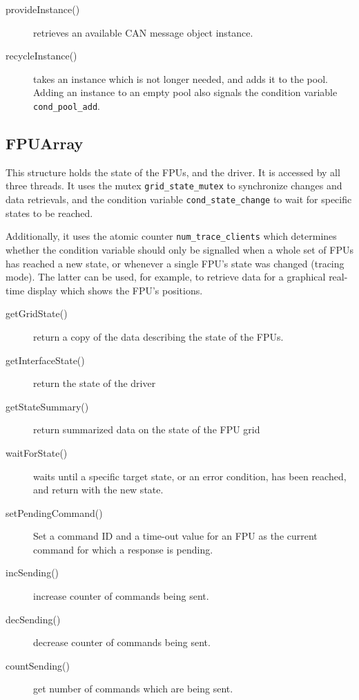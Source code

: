 \documentclass[fontsize=12,a4paper]{scrartcl}
\begin{document}
\begin{description}
  \item[provideInstance()] retrieves an available CAN message object instance.
  \item[recycleInstance()] takes an instance which is not longer
    needed, and adds it to the pool. Adding an instance to an empty
    pool also signals the condition variable \texttt{cond\_pool\_add}.
\end{description}

\subsection{FPUArray}

This structure holds the state of the FPUs, and the driver.  It is
accessed by all three threads. It uses the mutex
\texttt{grid\_state\_mutex} to synchronize changes and data
retrievals, and the condition variable \texttt{cond\_state\_change} to
wait for specific states to be reached.

Additionally, it uses the atomic counter \texttt{num\_trace\_clients}
which determines whether the condition variable should only be
signalled when a whole set of FPUs has reached a new state, or
whenever a single FPU's state was changed (tracing mode).  The latter
can be used, for example, to retrieve data for a graphical real-time
display which shows the FPU's positions.

\begin{description}
  \item[getGridState()] return a copy of the data describing the state of the FPUs.
  \item[getInterfaceState()] return the state of the driver
  \item[getStateSummary()] return summarized data on the state of the FPU grid
  \item[waitForState()] waits until a specific target state, or an error condition,
    has been reached, and return with the new state.
  \item[setPendingCommand()] Set a command ID and a time-out value for an FPU
    as the current command for which a response is pending.
  \item[incSending()] increase counter of commands being sent.
  \item[decSending()] decrease counter of commands being sent.
  \item[countSending()] get number of commands which are being sent.
\end{description}
\end{document}
